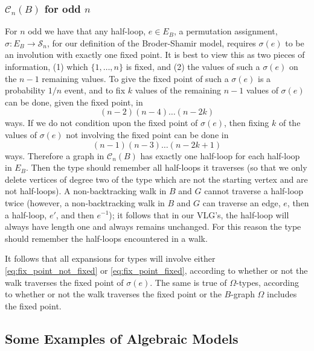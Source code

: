 \documentclass{memo-l}
\theoremstyle{plain}
\theoremstyle{definition}
\numberwithin{section}{chapter}
\numberwithin{equation}{chapter}
\newcommand{\from}{\colon}
\theoremstyle{plain}
\theoremstyle{definition}
\newcommand\cC{\mathcal{C}}
\newcommand\cS{\mathcal{S}}
\begin{document}
\subsubsection{$\cC_n(B)$ for odd $n$}

For $n$ odd we have that any half-loop, $e\in E_B$, a permutation
assignment, $\sigma\from E_B\to \cS_n$, for our definition of the
Broder-Shamir model, requires
$\sigma(e)$ to be an involution
with exactly one fixed point.
It is best to view this as two pieces of information, (1) which
$\{1,\ldots,n\}$ is fixed, and (2) the values of such a $\sigma(e)$
on the $n-1$ remaining values.
To give the fixed point of such a $\sigma(e)$ is a probability
$1/n$ event, and to fix $k$ values of the remaining $n-1$ values of 
$\sigma(e)$ can be done, given the fixed point, in
\begin{equation}\label{eq:fix_point_fixed}
(n-2)(n-4)\ldots(n-2k)
\end{equation}
ways.  If we do not condition upon the fixed point of $\sigma(e)$,
then fixing $k$ of the values of $\sigma(e)$ not involving the fixed
point can be done in
\begin{equation}\label{eq:fix_point_not_fixed}
(n-1)(n-3)\ldots(n-2k+1)
\end{equation}
ways.
Therefore a graph in $\cC_n(B)$ has exactly one half-loop for each
half-loop in $E_B$.
Then the type should remember all half-loops it traverses
(so that we only delete vertices of degree two of the type which are
not the starting vertex and are not half-loops).
A non-backtracking walk in $B$ and $G$ cannot traverse a half-loop
twice (however, a non-backtracking walk in $B$ and $G$ can
traverse an edge, $e$, then a half-loop, $e'$, and then $e^{-1}$);
it follows that in our VLG's, the half-loop will always have length
one and always remains unchanged.
For this reason the type should remember the half-loops encountered
in a walk.

It follows that all expansions for types will involve either
\eqref{eq:fix_point_not_fixed} or
\eqref{eq:fix_point_fixed}, according to whether or not the walk
traverses the fixed point of $\sigma(e)$.
The same is true of $\Omega$-types, according to whether or not
the walk traverses the fixed point or the $B$-graph $\Omega$ includes
the fixed point.



\subsection{Some Examples of Algebraic Models}
\end{document}
